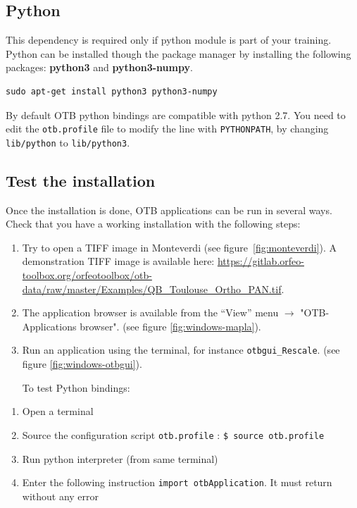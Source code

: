 \documentclass[10pt,a4paper]{article}
\begin{document}
\subsection{Python}

This dependency is required only if python module is part of your training. Python can be installed though the package manager by installing the following packages: \textbf{python3} and \textbf{python3-numpy}.
\begin{verbatim}
sudo apt-get install python3 python3-numpy
\end{verbatim}

By default OTB python bindings are compatible with python 2.7. You need to edit the \verb?otb.profile? file to modify the line with \verb?PYTHONPATH?, by changing \verb?lib/python? to \verb?lib/python3?.


\subsection{Test the installation}
Once the installation is done, OTB applications can be run in several ways. Check that you have a working installation with the following steps:
\begin{enumerate}

\item Try to open a TIFF image in Monteverdi (see
figure~\ref{fig:monteverdi}). A demonstration TIFF image is available here: \url{https://gitlab.orfeo-toolbox.org/orfeotoolbox/otb-data/raw/master/Examples/QB\_Toulouse\_Ortho\_PAN.tif}.

\item The application browser is available from the ``View'' menu 
$\rightarrow$ "OTB-Applications browser".
(see figure \ref{fig:windows-mapla}).

\item Run an application using the terminal, for instance
\texttt{otbgui\_Rescale}. (see figure \ref{fig:windows-otbgui}).

To test Python bindings:

\end{enumerate}

\begin{enumerate}
 \item Open a terminal
 \item Source the configuration script \verb?otb.profile? : \verb?$ source otb.profile?
 \item Run python interpreter (from same terminal)
 \item Enter the following instruction \verb?import otbApplication?. It must return without any error
\end{enumerate}
\end{document}
